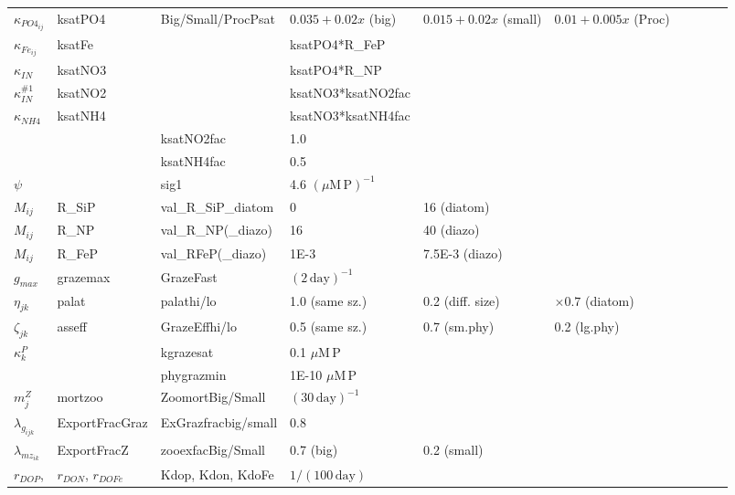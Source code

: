 \documentclass[letterpaper,10pt]{article}
\newcommand{\dy}{\mathrm{day}}
\newcommand{\uM}{\mu\mathrm{M}}
\renewcommand{\P}{\mathrm{P}}
\begin{document}
\begin{tabular}{llllllllll}
  $\kappa_{PO4_{ij}}$ & ksatPO4 & Big/Small/ProcPsat & $0.035+0.02x$ (big) & $0.015+0.02x$ (small) & $0.01+0.005x$ (Proc) \\
  $\kappa_{Fe_{ij}}$  & ksatFe  &                    & ksatPO4*R\_FeP       \\
  $\kappa_{IN}$       & ksatNO3 &                    & ksatPO4*R\_NP        \\
  $\kappa_{IN}^{\#1}$ & ksatNO2 &                    & ksatNO3*ksatNO2fac   \\
  $\kappa_{NH4}$      & ksatNH4 &                    & ksatNO3*ksatNH4fac   \\
                      &         & ksatNO2fac         & 1.0 \\
                      &         & ksatNH4fac         & 0.5 \\
  $\psi$              &         & sig1               & 4.6 $(\uM\,\P)^{-1}$ \\
  \hline
  $M_{ij}$            & R\_SiP  & val\_R\_SiP\_diatom & 0      & 16 (diatom) \\
  $M_{ij}$            & R\_NP   & val\_R\_NP(\_diazo) & 16     & 40 (diazo) \\
  $M_{ij}$            & R\_FeP  & val\_RFeP(\_diazo)  & 1E-3   & 7.5E-3 (diazo) \\
  \hline
  $g_{max}$           & grazemax       & GrazeFast           & $(2\,\dy)^{-1}$ \\
  $\eta_{j k}$        & palat          & palathi/lo          & 1.0 (same sz.)  & 0.2 (diff. size)   & $\times 0.7$ (diatom) \\
  $\zeta_{j k}$       & asseff         & GrazeEffhi/lo       & 0.5 (same sz.)  & 0.7 (sm.phy)       & 0.2 (lg.phy) \\
  $\kappa^P_k$        &                & kgrazesat           & 0.1 $\uM\,\P$ \\
                      &                & phygrazmin          & 1E-10 $\uM\,\P$ \\
  $m^Z_j$             & mortzoo        & ZoomortBig/Small    & $(30\,\dy)^{-1}$ \\
  $\lambda_{g_{ijk}}$ & ExportFracGraz & ExGrazfracbig/small & 0.8 \\
  $\lambda_{mz_{ik}}$ & ExportFracZ    & zooexfacBig/Small   & 0.7 (big) & 0.2 (small) \\
  \hline
  $r_{DOP}$, & $r_{DON}$, $r_{DOFe}$   & Kdop, Kdon, KdoFe & $1/(100\,\dy)$ \\

\end{tabular}
\end{document}
